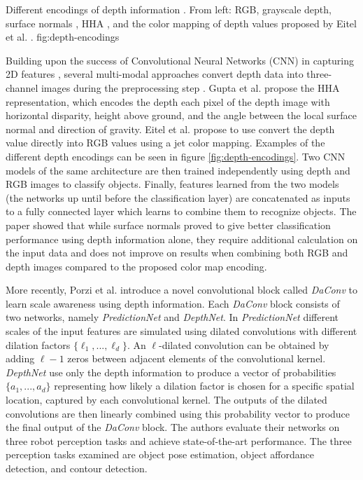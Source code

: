              {Different encodings of depth information \cite{Eitel2015}. From left: RGB, grayscale depth, surface
              normals \cite{Bo2013}, HHA \cite{Gupta2014RGBDFeatures}, and the color mapping of depth values proposed
              by Eitel et al. \cite{Eitel2015}.}
             {fig:depth-encodings}{\linewidth}

Building upon the success of Convolutional Neural Networks (CNN) in capturing 2D features \cite{Gu2018}, several
multi-modal approaches convert depth data into three-channel images during the preprocessing step
\cite{Eitel2015,Gupta2014RGBDFeatures}. Gupta et al. \cite{Gupta2014RGBDFeatures} propose the HHA representation, which
encodes the depth each pixel of the depth image with horizontal disparity, height above ground, and the angle between
the local surface normal and direction of gravity. Eitel et al. \cite{Eitel2015} propose to use convert the depth value
directly into RGB values using a jet color mapping. Examples of the different depth encodings can be seen in figure
\ref{fig:depth-encodings}. Two CNN models of the same architecture are then trained independently using depth and RGB
images to classify objects. Finally, features learned from the two models (the networks up until before the
classification layer) are concatenated as inputs to a fully connected layer which learns to combine them to recognize
objects. The paper showed that while surface normals proved to give better classification performance using depth
information alone, they require additional calculation on the input data and does not improve on results when combining
both RGB and depth images compared to the proposed color map encoding.

More recently, Porzi et al. \cite{Porzi2017} introduce a novel convolutional block called \emph{DaConv} to learn scale
awareness using depth information. Each \emph{DaConv} block consists of two networks, namely \emph{PredictionNet} and
\emph{DepthNet}. In \emph{PredictionNet} different scales of the input features are simulated using dilated convolutions
\cite{YuKoltun2016} with different dilation factors $ \{ \ell_1,...,\ell_d \} $. An $ \ell $-dilated convolution can be
obtained by adding $ \ell - 1 $ zeros between adjacent elements of the convolutional kernel. \emph{DepthNet} use only
the depth information to produce a vector of probabilities $ \{ a_1,...,a_d \} $ representing how likely a dilation
factor is chosen for a specific spatial location, captured by each convolutional kernel. The outputs of the dilated
convolutions are then linearly combined using this probability vector to produce the final output of the \emph{DaConv}
block. The authors evaluate their networks on three robot perception tasks and achieve state-of-the-art performance. The
three perception tasks examined are object pose estimation, object affordance detection, and contour detection.

